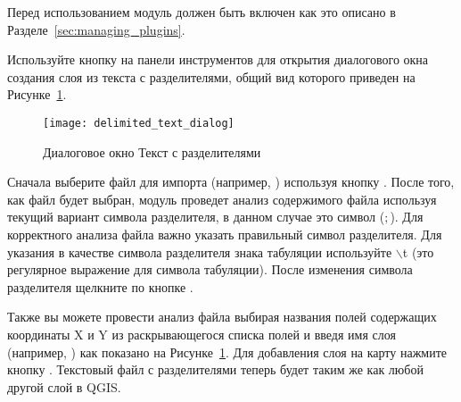 Перед использованием модуль должен быть включен как это описано в
Разделе~\ref{sec:managing_plugins}.

Используйте кнопку 
на панели инструментов для открытия диалогового окна создания слоя из
текста с разделителями, общий вид которого приведен на Рисунке~\ref{fig:delim_text_plugin_dialog}.

\begin{figure}[ht]
   \centering
   \texttt{[image: delimited\_text\_dialog]}
   \caption{Диалоговое окно Текст с разделителями \nixcaption}\label{fig:delim_text_plugin_dialog}
\end{figure}

Сначала выберите файл для импорта (например, )
используя кнопку . После того, как файл будет выбран, модуль
проведет анализ содержимого файла используя текущий вариант символа
разделителя, в данном случае это символ (\mbox{$;$}). Для корректного
анализа файла важно указать правильный символ разделителя. Для указания
в качестве символа разделителя знака табуляции используйте
\mbox{$\backslash$}t (это регулярное выражение для символа табуляции).
После изменения символа разделителя щелкните по кнопке .

Также вы можете провести анализ файла выбирая названия полей содержащих
координаты X и Y из раскрывающегося списка полей и введя имя слоя
(например,  ) как показано на Рисунке~\ref{fig:delim_text_plugin_dialog}.
Для добавления слоя на карту нажмите кнопку . Текстовый файл
с разделителями теперь будет таким же как любой другой слой в QGIS.

\FloatBarrier
